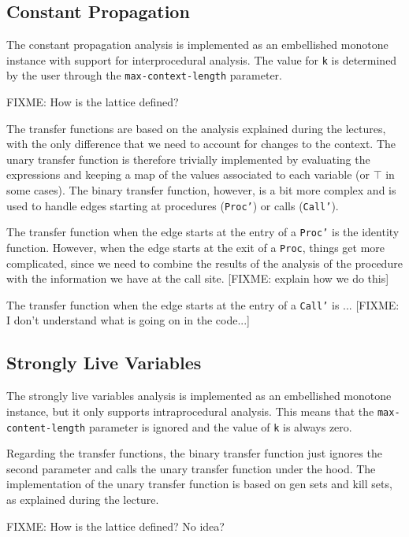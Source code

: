 \documentclass{article}
\begin{document}
\subsection*{Constant Propagation}

The constant propagation analysis is implemented as an embellished monotone instance with support for interprocedural analysis. The value for \texttt{k} is determined by the user through the \texttt{max-context-length} parameter.

FIXME: How is the lattice defined?

The transfer functions are based on the analysis explained during the lectures, with the only difference that we need to account for changes to the context. The unary transfer function is therefore trivially implemented by evaluating the expressions and keeping a map of the values associated to each variable (or $\top$ in some cases). The binary transfer function, however, is a bit more complex and is used to handle edges starting at procedures (\texttt{Proc'}) or calls (\texttt{Call'}).

The transfer function when the edge starts at the entry of a \texttt{Proc'} is the identity function. However, when the edge starts at the exit of a \texttt{Proc}, things get more complicated, since we need to combine the results of the analysis of the procedure with the information we have at the call site. [FIXME: explain how we do this]

The transfer function when the edge starts at the entry of a \texttt{Call'} is ... [FIXME: I don't understand what is going on in the code...]

\subsection*{Strongly Live Variables}

The strongly live variables analysis is implemented as an embellished monotone instance, but it only supports intraprocedural analysis. This means that the \texttt{max-content-length} parameter is ignored and the value of \texttt{k} is always zero.

Regarding the transfer functions, the binary transfer function just ignores the second parameter and calls the unary transfer function under the hood. The implementation of the unary transfer function is based on gen sets and kill sets, as explained during the lecture.

FIXME: How is the lattice defined? No idea?
\end{document}
